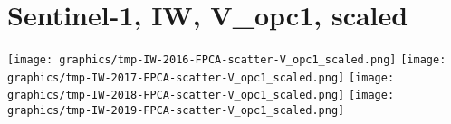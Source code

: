 
\section{Sentinel-1, IW, V\_opc1, scaled}
\setcounter{theorem}{0}

\renewcommand{\theenumi}{\roman{enumi}}
\renewcommand{\labelenumi}{\textnormal{(\theenumi)}$\;\;$}


\begin{center}
\begin{minipage}{7.0in}
\texttt{[image: graphics/tmp-IW-2016-FPCA-scatter-V\_opc1\_scaled.png]}
\quad
\texttt{[image: graphics/tmp-IW-2017-FPCA-scatter-V\_opc1\_scaled.png]}
\vskip 0.5cm
\texttt{[image: graphics/tmp-IW-2018-FPCA-scatter-V\_opc1\_scaled.png]}
\quad
\texttt{[image: graphics/tmp-IW-2019-FPCA-scatter-V\_opc1\_scaled.png]}
\end{minipage}
\end{center}


\renewcommand{\theenumi}{\roman{enumi}}
\renewcommand{\labelenumi}{\textnormal{(\theenumi)}$\;\;$}

